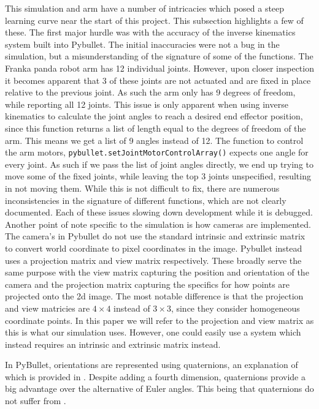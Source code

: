 This simulation and arm have a number of intricacies which posed a steep learning curve near the start of this project. This subsection highlights a few of these. The first major hurdle was with the accuracy of the inverse kinematics system built into Pybullet. The initial inaccuracies were not a bug in the simulation, but a misunderstanding of the signature of some of the functions.
The Franka panda robot arm has 12 individual joints. However, upon closer inspection it becomes apparent that 3 of these joints are not actuated and are fixed in place relative to the previous joint. As such the arm only has 9 degrees of freedom, while reporting all 12 joints. This issue is only apparent when using inverse kinematics to calculate the joint angles to reach a desired end effector position, since this function returns a list of length equal to the degrees of freedom of the arm. This means we get a list of 9 angles instead of 12. The function to control the arm motors, \verb|pybullet.setJointMotorControlArray()| expects one angle for every joint. As such if we pass the list of joint angles directly, we end up trying to move some of the fixed joints, while leaving the top 3 joints unspecified, resulting in not moving them. While this is not difficult to fix, there are numerous inconsistencies in the signature of different functions, which are not clearly documented. Each of these issues slowing down development while it is debugged.\\

Another point of note specific to the simulation is how cameras are implemented. The camera's in Pybullet do not use the standard intrinsic and extrinsic matrix to convert world coordinate to pixel coordinates in the image. Pybullet instead uses a projection matrix and view matrix respectively. These broadly serve the same purpose with the view matrix capturing the position and orientation of the camera and the projection matrix capturing the specifics for how points are projected onto the 2d image. The most notable difference is that the projection and view matricies are $4\times4$ instead of $3\times3$, since they consider homogeneous coordinate points. In this paper we will refer to the projection and view matrix as this is what our simulation uses. However, one could easily use a system which instead requires an intrinsic and extrinsic matrix instead.

 In PyBullet, orientations are represented using quaternions, \cite{quaternions}\cite{orientations} an explanation of which is provided in . Despite adding a fourth dimension, quaternions provide a big advantage over the alternative of Euler angles. This being that quaternions do not suffer from . %


